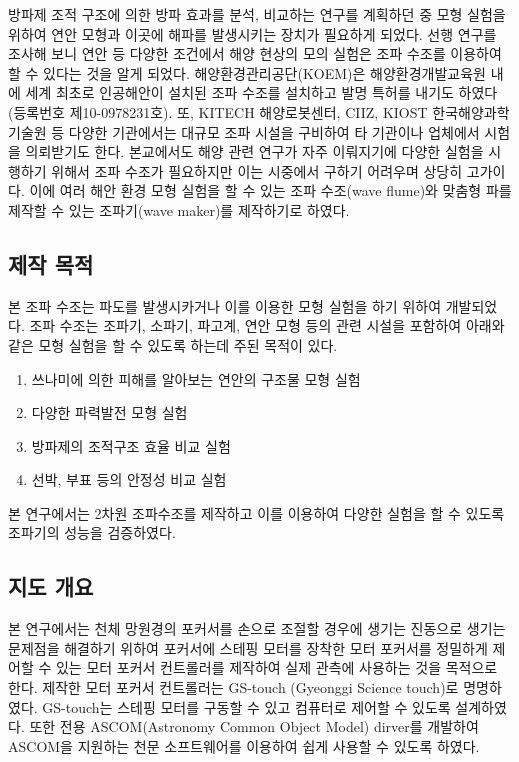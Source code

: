방파제 조적 구조에 의한 방파 효과를 분석, 비교하는 연구를 계획하던 중 모형 실험을 위하여 연안 모형과 이곳에 해파를 발생시키는 장치가 필요하게 되었다. 선행 연구를 조사해 보니 연안 등 다양한 조건에서 해양 현상의 모의 실험은 조파 수조를 이용하여 할 수 있다는 것을 알게 되었다\cite{chung2013}. 해양환경관리공단(KOEM)은 해양환경개발교육원 내에 세계 최초로 인공해안이 설치된 조파 수조를 설치하고 발명 특허를 내기도 하였다 (등록번호 제10-0978231호). 또, KITECH 해양로봇센터, CIIZ, KIOST 한국해양과학기술원 등 다양한 기관에서는 대규모 조파 시설을 구비하여 타 기관이나 업체에서 시험을 의뢰받기도 한다. 본교에서도 해양 관련 연구가 자주 이뤄지기에 다양한 실험을 시행하기 위해서 조파 수조가 필요하지만 이는 시중에서 구하기 어려우며 상당히 고가이다. 이에 여러 해안 환경 모형 실험을 할 수 있는 조파 수조(wave flume)와 맞춤형 파를 제작할 수 있는 조파기(wave maker)를 제작하기로 하였다. 


\subsection{제작 목적}

본 조파 수조는 파도를 발생시카거나 이를 이용한 모형 실험을 하기 위하여 개발되었다. 조파 수조는 조파기, 소파기, 파고계, 연안 모형 등의 관련 시설을 포함하여 아래와 같은 모형 실험을 할 수 있도록 하는데 주된 목적이 있다.

\begin{enumerate}
    \item 쓰나미에 의한 피해를 알아보는 연안의 구조물 모형 실험
    \item 다양한 파력발전 모형 실험
    \item 방파제의 조적구조 효율 비교 실험
    \item 선박, 부표 등의 안정성 비교 실험
\end{enumerate}

본 연구에서는 2차원 조파수조를 제작하고 이를 이용하여 다양한 실험을 할 수 있도록 조파기의 성능을 검증하였다. 


\subsection{지도 개요}

본 연구에서는 천체 망원경의 포커서를 손으로 조절할 경우에 생기는 진동으로 생기는 문제점을 해결하기 위하여 포커서에 스테핑 모터를 장착한 모터 포커서를 정밀하게 제어할 수 있는 모터 포커서 컨트롤러를 제작하여 실제 관측에 사용하는 것을 목적으로 한다. 제작한 모터 포커서 컨트롤러는 GS-touch (Gyeonggi Science touch)로 명명하였다. GS-touch는 스테핑 모터를 구동할 수 있고 컴퓨터로 제어할 수 있도록 설계하였다. 또한 전용 ASCOM(Astronomy Common Object Model) dirver를 개발하여 ASCOM을 지원하는 천문 소프트웨어를 이용하여 쉽게 사용할 수 있도록 하였다. 

